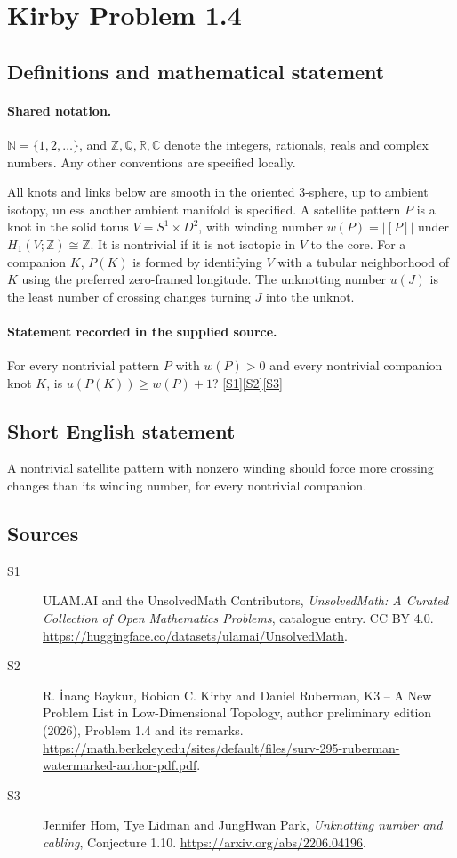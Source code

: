 \documentclass[11pt]{article}
\newcommand{\sref}[2]{\hyperlink{source:#1:#2}{[S#2]}}
\begin{document}
\section{Kirby Problem 1.4}\label{statement}

\subsection{Definitions and mathematical statement}

\paragraph{Shared notation.}$\mathbb N=\{1,2,\ldots\}$, and $\mathbb Z,\mathbb Q,\mathbb R,\mathbb C$ denote the integers, rationals, reals and complex numbers. Any other conventions are specified locally.


All knots and links below are smooth in the oriented $3$-sphere, up to ambient isotopy, unless another ambient manifold is specified. A satellite pattern $P$ is a knot in the solid torus $V=S^1\times D^2$, with winding number $w(P)=|[P]|$ under $H_1(V;\mathbb Z)\cong\mathbb Z$. It is nontrivial if it is not isotopic in $V$ to the core. For a companion $K$, $P(K)$ is formed by identifying $V$ with a tubular neighborhood of $K$ using the preferred zero-framed longitude. The unknotting number $u(J)$ is the least number of crossing changes turning $J$ into the unknot.
\paragraph{Statement recorded in the supplied source.}
For every nontrivial pattern $P$ with $w(P)>0$ and every nontrivial companion knot $K$, is $u(P(K))\geq w(P)+1$? \sref{statement}{1}\sref{statement}{2}\sref{statement}{3}
\subsection{Short English statement}
A nontrivial satellite pattern with nonzero winding should force more crossing changes than its winding number, for every nontrivial companion.
\subsection{Sources}
\begin{description}
\item[\hypertarget{source:statement:1}{S1}] ULAM.AI and the UnsolvedMath Contributors, \emph{UnsolvedMath: A Curated Collection of Open Mathematics Problems}, catalogue entry. CC BY 4.0. \url{https://huggingface.co/datasets/ulamai/UnsolvedMath}.
\item[\hypertarget{source:statement:2}{S2}] R. \.{I}nan\c{c} Baykur, Robion C. Kirby and Daniel Ruberman, K3 -- A New Problem List in Low-Dimensional Topology, author preliminary edition (2026), Problem 1.4 and its remarks. \url{https://math.berkeley.edu/sites/default/files/surv-295-ruberman-watermarked-author-pdf.pdf}.
\item[\hypertarget{source:statement:3}{S3}] Jennifer Hom, Tye Lidman and JungHwan Park, \emph{Unknotting number and cabling}, Conjecture 1.10. \url{https://arxiv.org/abs/2206.04196}.
\end{description}
\label{end:statement}
\end{document}
